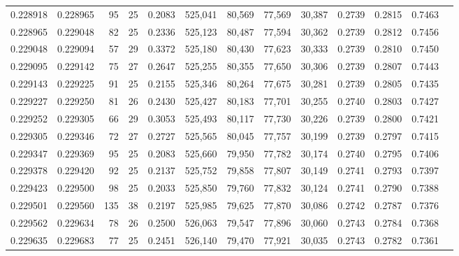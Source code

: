 \begin{tabular}{rrrrrrrrrrrrr}
0.228918 & 0.228965 &  95 &  25 &                                     0.2083 & 525,041 &  80,569 &  77,569 &  30,387 & 0.2739 & 0.2815 & 0.7463 \\
0.228965 & 0.229048 &  82 &  25 &                                     0.2336 & 525,123 &  80,487 &  77,594 &  30,362 & 0.2739 & 0.2812 & 0.7456 \\
0.229048 & 0.229094 &  57 &  29 &                                     0.3372 & 525,180 &  80,430 &  77,623 &  30,333 & 0.2739 & 0.2810 & 0.7450 \\
0.229095 & 0.229142 &  75 &  27 &                                     0.2647 & 525,255 &  80,355 &  77,650 &  30,306 & 0.2739 & 0.2807 & 0.7443 \\
0.229143 & 0.229225 &  91 &  25 &                                     0.2155 & 525,346 &  80,264 &  77,675 &  30,281 & 0.2739 & 0.2805 & 0.7435 \\
0.229227 & 0.229250 &  81 &  26 &                                     0.2430 & 525,427 &  80,183 &  77,701 &  30,255 & 0.2740 & 0.2803 & 0.7427 \\
0.229252 & 0.229305 &  66 &  29 &                                     0.3053 & 525,493 &  80,117 &  77,730 &  30,226 & 0.2739 & 0.2800 & 0.7421 \\
0.229305 & 0.229346 &  72 &  27 &                                     0.2727 & 525,565 &  80,045 &  77,757 &  30,199 & 0.2739 & 0.2797 & 0.7415 \\
0.229347 & 0.229369 &  95 &  25 &                                     0.2083 & 525,660 &  79,950 &  77,782 &  30,174 & 0.2740 & 0.2795 & 0.7406 \\
0.229378 & 0.229420 &  92 &  25 &                                     0.2137 & 525,752 &  79,858 &  77,807 &  30,149 & 0.2741 & 0.2793 & 0.7397 \\
0.229423 & 0.229500 &  98 &  25 &                                     0.2033 & 525,850 &  79,760 &  77,832 &  30,124 & 0.2741 & 0.2790 & 0.7388 \\
0.229501 & 0.229560 & 135 &  38 &                                     0.2197 & 525,985 &  79,625 &  77,870 &  30,086 & 0.2742 & 0.2787 & 0.7376 \\
0.229562 & 0.229634 &  78 &  26 &                                     0.2500 & 526,063 &  79,547 &  77,896 &  30,060 & 0.2743 & 0.2784 & 0.7368 \\
0.229635 & 0.229683 &  77 &  25 &                                     0.2451 & 526,140 &  79,470 &  77,921 &  30,035 & 0.2743 & 0.2782 & 0.7361 \\

\end{tabular}
